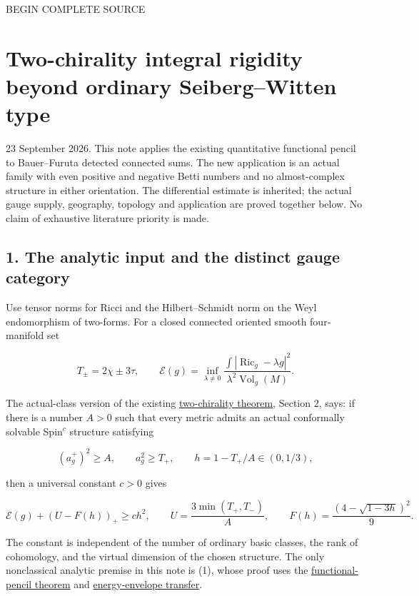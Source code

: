\documentclass[
  10pt,
]{article}
\begin{document}
BEGIN COMPLETE SOURCE

\hypertarget{two-chirality-integral-rigidity-beyond-ordinary-seibergwitten-type}{%
\section{Two-chirality integral rigidity beyond ordinary Seiberg--Witten
type}\label{two-chirality-integral-rigidity-beyond-ordinary-seibergwitten-type}}

23 September 2026. This note applies the existing quantitative
functional pencil to Bauer--Furuta detected connected sums. The new
application is an actual family with even positive and negative Betti
numbers and no almost-complex structure in either orientation. The
differential estimate is inherited; the actual gauge supply, geography,
topology and application are proved together below. No claim of
exhaustive literature priority is made.

\hypertarget{the-analytic-input-and-the-distinct-gauge-category}{%
\subsection{1. The analytic input and the distinct gauge
category}\label{the-analytic-input-and-the-distinct-gauge-category}}

Use tensor norms for Ricci and the Hilbert--Schmidt norm on the Weyl
endomorphism of two-forms. For a closed connected oriented smooth
four-manifold set

\[
 T_\pm=2\chi\pm3\tau,\qquad
 \mathcal E(g)=\inf_{\lambda\ne0}
 \frac{\int|\operatorname{Ric}_g-\lambda g|^2}
      {\lambda^2\operatorname{Vol}_g(M)}.
\]

The actual-class version of the existing
\href{line1_two_chirality_topology.md}{two-chirality theorem}, Section
2, says: if there is a number \(A>0\) such that every metric admits an
actual conformally solvable Spin\(^c\) structure satisfying

\[
 (a_g^+)^2\ge A,\qquad a_g^2\ge T_+,
 \qquad h=1-T_+/A\in(0,1/3),
\]

then a universal constant \(c>0\) gives

\[
 \mathcal E(g)+(U-F(h))_+\ge ch^2,\qquad
 U=\frac{3\min(T_+,T_-)}A,
 \qquad F(h)=\frac{(4-\sqrt{1-3h})^2}{9}.
 \tag{1}
\]

The constant is independent of the number of ordinary basic classes, the
rank of cohomology, and the virtual dimension of the chosen structure.
The only nonclassical analytic premise in this note is (1), whose proof
uses the \href{line1_functional_pencil.md}{functional-pencil theorem}
and \href{line1_energy_envelope_gap.md}{energy-envelope transfer}.
\end{document}
